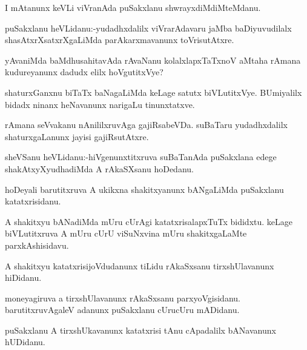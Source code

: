 \documentclass{article}
\begin{document}
\begin{mn}%
I mAtanunx keVLi viVranAda puSakxlanu shwrayxdiMdiMteMdanu.
\end{mn}

\begin{mn}%
puSakxlanu heVLidanu:-yudadhxdalilx viVrarAdavaru jaMba baDiyuvudilalx 
shasAtxrXsatxrXgaLiMda parAkarxmavanunx toVrisutAtxre.
\end{mn}

\begin{mn}%
yAvaniMda baMdhusahitavAda rAvaNanu kolalxlapxTaTxnoV aMtaha rAmana kudureyanunx dadudx 
elilx hoVgutitxVye?
\end{mn}

\begin{mn}%
shaturxGanxnu biTaTx baNagaLiMda keLage satutx biVLutitxVye. BUmiyalilx bidadx ninanx 
heNavanunx narigaLu tinunxtatxve.
\end{mn}

\begin{mn}%
rAmana seVvakanu nAnililxruvAga gajiRsabeVDa. suBaTaru yudadhxdalilx shaturxgaLanunx 
jayisi gajiRsutAtxre.
\end{mn}

\begin{mn}%
sheVSanu heVLidanu:-hiVgenunxtitxruva suBaTanAda puSakxlana edege shakAtxyXyudhadiMda A 
rAkaSXsanu hoDedanu.
\end{mn}

\begin{mn}%
hoDeyali barutitxruva A ukikxna shakitxyanunx bANgaLiMda puSakxlanu katatxrisidanu.
\end{mn}

\begin{mn}%
A shakitxyu bANadiMda mUru cUrAgi katatxrisalapxTuTx bididxtu. keLage biVLutitxruva A mUru 
cUrU viSuNxvina mUru shakitxgaLaMte parxkAshisidavu.
\end{mn}

\begin{mn}%
A shakitxyu katatxrisijoVdudanunx tiLidu rAkaSxsanu tirxshUlavanunx hiDidanu.
\end{mn}

\begin{mn}%
moneyagiruva a tirxshUlavanunx rAkaSxsanu parxyoVgisidanu. barutitxruvAgaleV adanunx 
puSakxlanu cUrucUru mADidanu.
\end{mn}

\begin{mn}%
puSakxlanu A tirxshUkavanunx katatxrisi tAnu cApadalilx bANavanunx hUDidanu.
\end{mn}
\end{document}
